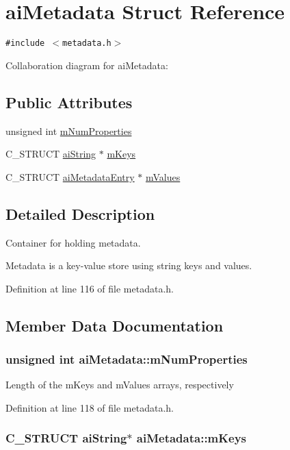 \hypertarget{structai_metadata}{
\section{aiMetadata Struct Reference}
\label{structai_metadata}
}
{\tt \#include $<$metadata.h$>$}

Collaboration diagram for aiMetadata:\subsection*{Public Attributes}
\begin{CompactItemize}
\item 
unsigned int \hyperlink{structai_metadata_32c4587c53dd402a5878ffc94088e528}{mNumProperties}
\item 
C\_\-STRUCT \hyperlink{structai_string}{aiString} $\ast$ \hyperlink{structai_metadata_a8c77a263443658737ee51a74e3c292e}{mKeys}
\item 
C\_\-STRUCT \hyperlink{structai_metadata_entry}{aiMetadataEntry} $\ast$ \hyperlink{structai_metadata_34b515fcb5b806c471d3c6ce7bc76beb}{mValues}
\end{CompactItemize}


\subsection{Detailed Description}
Container for holding metadata.

Metadata is a key-value store using string keys and values. 

Definition at line 116 of file metadata.h.

\subsection{Member Data Documentation}
\hypertarget{structai_metadata_32c4587c53dd402a5878ffc94088e528}{
\subsubsection[mNumProperties]{\setlength{\rightskip}{0pt plus 5cm}unsigned int {\bf aiMetadata::mNumProperties}}}
\label{structai_metadata_32c4587c53dd402a5878ffc94088e528}


Length of the mKeys and mValues arrays, respectively 

Definition at line 118 of file metadata.h.\hypertarget{structai_metadata_a8c77a263443658737ee51a74e3c292e}{
\subsubsection[mKeys]{\setlength{\rightskip}{0pt plus 5cm}C\_\-STRUCT {\bf aiString}$\ast$ {\bf aiMetadata::mKeys}}}
\label{structai_metadata_a8c77a263443658737ee51a74e3c292e}


